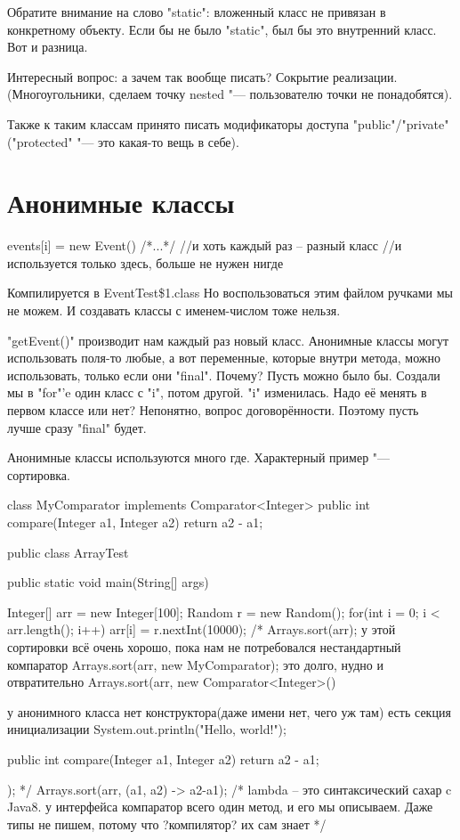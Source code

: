 Обратите внимание на слово \java"static": вложенный класс не привязан в конкретному объекту.
Если бы не было \java"static", был бы это внутренний класс.
Вот и разница.


Интересный вопрос: а зачем так вообще писать? Сокрытие реализации.
(Многоугольники, сделаем точку nested "--- пользователю точки не понадобятся).

Также к таким классам принято писать модификаторы доступа \java"public"/\java"private" 
(\java"protected" "--- это какая-то вещь в себе).


\section{Анонимные классы}
\begin{javacode}
events[i] = new Event() {
	/*...*/
}//и хоть каждый раз -- разный класс
//и используется только здесь, больше не нужен нигде
\end{javacode}
Компилируется в EventTest\$1.class
Но воспользоваться этим файлом ручками мы не можем.
И создавать классы с именем-числом тоже нельзя.

\java"getEvent()" производит нам каждый раз новый класс.
Анонимные классы могут использовать поля-то любые, а вот переменные, которые внутри метода,
можно использовать, только если они \java"final". Почему?
Пусть можно было бы. Создали мы в \java"for"'e один класс с \java"i", потом другой. \java"i" изменилась. 
Надо её менять в первом классе или нет?
Непонятно, вопрос договорённости. Поэтому пусть лучше сразу \java"final" будет.

Анонимные классы используются много где.
Характерный пример "--- сортировка.
\begin{javacode}
class MyComparator implements Comparator<Integer> {
	public int compare(Integer a1, Integer a2) {
		return a2 - a1;
	}
}

public class ArrayTest {
	public static void main(String[] args) {
		Integer[] arr = new Integer[100];
		Random r = new Random();
		for(int i = 0; i < arr.length(); i++) {
			arr[i] = r.nextInt(10000);
		}
/*
		Arrays.sort(arr);
у этой сортировки всё очень хорошо, пока нам не потребовался нестандартный компаратор
		Arrays.sort(arr, new MyComparator);
это долго, нудно и отвратительно
		Arrays.sort(arr, new Comparator<Integer>() {
у анонимного класса нет конструктора(даже имени нет, чего уж там)
есть секция инициализации
			{
				System.out.println("Hello, world!");
			}

			public int compare(Integer a1, Integer a2) {
				return a2 - a1;
			}
		});
*/
		Arrays.sort(arr, (a1, a2) -> a2-a1);
		/*
		lambda -- это синтаксический сахар c Java8.
		у интерфейса компаратор всего один метод, и его мы описываем. 
		Даже типы не пишем, потому что ?компилятор? их сам знает
		*/
	}
}	
\end{javacode}


